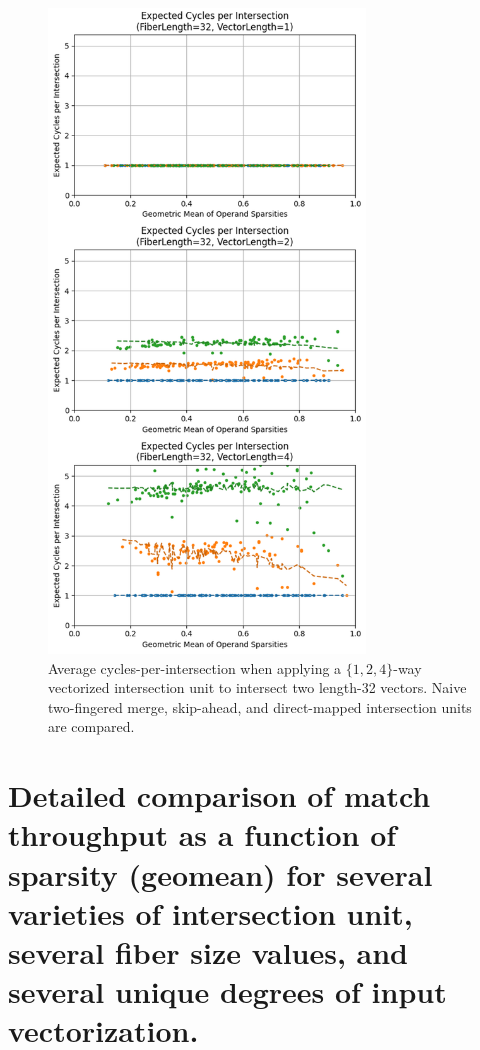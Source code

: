 \begin{figure}[H]
\includegraphics[width=0.75\textwidth]{figures/expected_cycles_F32.png}
\caption{Average cycles-per-intersection when applying a $\{1,2,4\}$-way vectorized intersection unit to intersect two length-32 vectors. Naive two-fingered merge, skip-ahead, and direct-mapped intersection units are compared.}
\label{fig:expected_cycles_F32}
\end{figure}

\clearpage

\section{Detailed comparison of match throughput as a function of sparsity (geomean) for several varieties of intersection unit, several fiber size values, and several unique degrees of input vectorization.}

